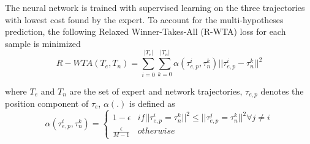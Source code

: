 The neural network is trained with supervised learning on the three trajectories with lowest cost found by the expert. To account for the multi-hypotheses prediction, the following Relaxed Winner-Takes-All (R-WTA) loss for each sample is minimized 
\begin{equation}
	R-WTA(T_e,T_n) = \sum^{|T_e|}_{i=0}\sum^{|T_n|}_{k=0} \alpha(\tau^i_{e,p},\tau^k_n)||\tau^i_{e,p}-\tau^k_n||^2
\end{equation}

where $T_e$ and $T_n$ are the set of expert and network trajectories, $\tau_{e,p}$ denotes the position component of $\tau_e$, $\alpha(.)$ is defined as 
\begin{equation}
	\alpha(\tau^i_{e,p}, \tau^k_n) = 
	\begin{cases}
		1-\epsilon & if ||\tau^i_{e,p}=\tau^k_n||^2 \le ||\tau^j_{e,p}=\tau^k_n||^2 \forall j \ne i \\
		\frac{\epsilon}{M-1} & otherwise
	\end{cases}
\end{equation}